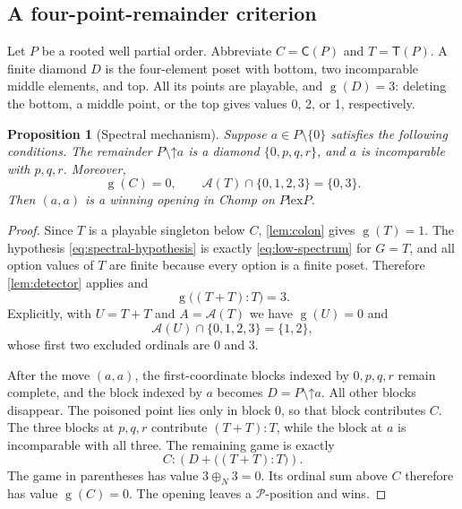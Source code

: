 \documentclass[11pt,letterpaper]{article}
\numberwithin{equation}{section}
\newtheorem{proposition}[theorem]{Proposition}
\theoremstyle{definition}
\theoremstyle{remark}
\newcommand{\sg}{\operatorname{g}}
\newcommand{\opt}{\mathcal A}
\newcommand{\Ch}{\mathsf C}
\newcommand{\Norm}{\mathsf T}
\newcommand{\Pout}{\mathcal P}
\newcommand{\nimadd}{\mathbin{\oplus_{\!N}}}
\newcommand{\up}{\mathord\uparrow}
\newcommand{\lex}{\mathbin{\mathrm{lex}}}
\begin{document}
\subsection{A four-point-remainder criterion}

Let $P$ be a rooted well partial order. Abbreviate $C=\Ch(P)$ and
$T=\Norm(P)$. A finite diamond $D$ is the four-element poset with
bottom, two incomparable middle elements, and top. All its points
are playable, and $\sg(D)=3$: deleting the bottom, a middle point,
or the top gives values 0, 2, or 1, respectively.

\begin{proposition}[Spectral mechanism]\label{prop:mechanism}
Suppose $a\in P\setminus\{0\}$ satisfies the following conditions.
The remainder $P\setminus\up a$ is a diamond
$\{0,p,q,r\}$, and $a$ is incomparable with $p,q,r$. Moreover,
\begin{equation}\label{eq:spectral-hypothesis}
 \sg(C)=0,\qquad
 \opt(T)\cap\{0,1,2,3\}=\{0,3\}.
\end{equation}
Then $(a,a)$ is a winning opening in Chomp on $P\lex P$.
\end{proposition}
\begin{proof}
Since $T$ is a playable singleton below $C$, \cref{lem:colon} gives
$\sg(T)=1$. The hypothesis \cref{eq:spectral-hypothesis} is exactly
\cref{eq:low-spectrum} for $G=T$, and all option values of $T$ are finite
because every option is a finite poset. Therefore \cref{lem:detector}
applies and
\begin{equation}\label{eq:V-three}
 \sg\bigl((T+T):T\bigr)=3.
\end{equation}
Explicitly, with $U=T+T$ and $A=\opt(T)$ we have $\sg(U)=0$ and
\begin{equation}\label{eq:U-low}
 \opt(U)\cap\{0,1,2,3\}=\{1,2\},
\end{equation}
whose first two excluded ordinals are 0 and 3.

After the move $(a,a)$, the first-coordinate blocks indexed by
$0,p,q,r$ remain complete, and the block indexed by $a$ becomes
$D=P\setminus\up a$. All other blocks disappear. The poisoned
point lies only in block 0, so that block contributes $C$.
The three blocks at $p,q,r$ contribute $(T+T):T$, while the block
at $a$ is incomparable with all three. The remaining game is exactly
\begin{equation}\label{eq:remaining-general}
 C:\left(D+\bigl((T+T):T\bigr)\right).
\end{equation}
The game in parentheses has value $3\nimadd3=0$. Its ordinal sum
above $C$ therefore has value $\sg(C)=0$. The opening leaves a
$\Pout$-position and wins.
\end{proof}
\end{document}
